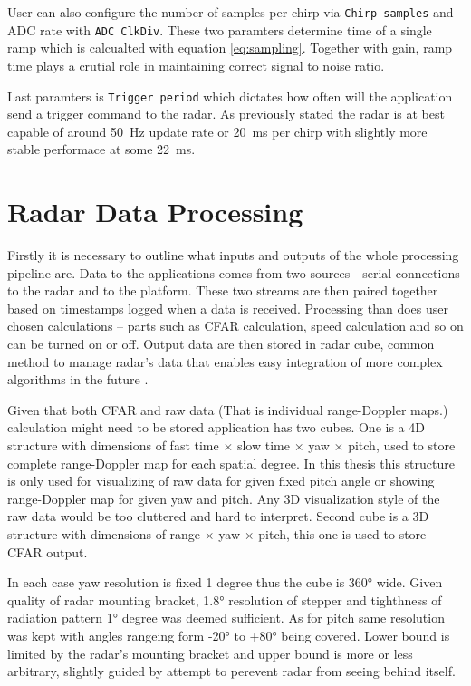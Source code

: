 User can also configure the number of samples per chirp via \texttt{Chirp samples} and ADC rate with \texttt{ADC ClkDiv}.
These two paramters determine time of a single ramp which is calcualted with equation \ref{eq:sampling}.
Together with gain, ramp time plays a crutial role in maintaining correct signal to noise ratio.

Last paramters is \texttt{Trigger period} which dictates how often will the application send a trigger command to the radar.
As previously stated the radar is at best capable of around 50~Hz update rate or 20~ms per chirp with slightly more stable performace at some 22~ms.


\chapter{Radar Data Processing}

Firstly it is necessary to outline what inputs and outputs of the whole processing pipeline are.
Data to the applications comes from two sources - serial connections to the radar and to the platform.
These two streams are then paired together based on timestamps logged when a data is received.
Processing than does user chosen calculations -- parts such as CFAR calculation, speed calculation and so on can be turned on or off.
Output data are then stored in radar cube, common method to manage radar's data that enables easy integration of more complex algorithms in the future \cite{richards2022}.

Given that both CFAR and raw data (That is individual range-Doppler maps.) calculation might need to be stored application has two cubes.
One is a 4D structure with dimensions of fast time $\times$ slow time $\times$ yaw $\times$ pitch, used to store complete range-Doppler map for each spatial degree.
In this thesis this structure is only used for visualizing of raw data for given fixed pitch angle or showing range-Doppler map for given yaw and pitch.
Any 3D visualization style of the raw data would be too cluttered and hard to interpret.
Second cube is a 3D structure with dimensions of range $\times$ yaw $\times$ pitch, this one is used to store CFAR output.

In each case yaw resolution is fixed 1 degree thus the cube is 360° wide.
Given quality of radar mounting bracket, 1.8° resolution of stepper and tighthness of radiation pattern 1° degree was deemed sufficient.
As for pitch same resolution was kept with angles rangeing form -20° to +80° being covered.
Lower bound is limited by the radar's mounting bracket and upper bound is more or less arbitrary, slightly guided by attempt to perevent radar from seeing behind itself.


